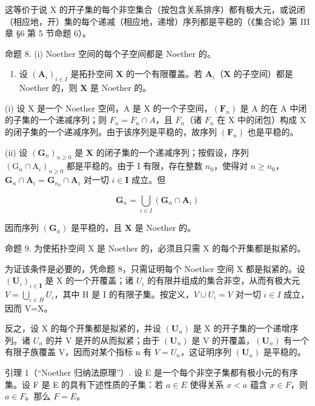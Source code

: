 这等价于说 X 的开子集的每个非空集合（按包含关系排序）都有极大元，或说闭（相应地，开）集的每个递减（相应地，递增）序列都是平稳的（《集合论》第 III 章 §6 第 5 节命题 6）。

命题 8. (i) Noether 空间的每个子空间都是 Noether 的。

\begin{enumerate}
\def\labelenumi{(\roman{enumi})}
\setcounter{enumi}{1}
\item
  设 \((\mathbf{A}_i)_{i\in I}\) 是拓扑空间 \(\mathbf{X}\) 的一个有限覆盖。若 \(\mathbf{A}_i\)（\(\mathbf{X}\) 的子空间）都是 Noether 的，则 \(\mathbf{X}\) 是 Noether 的。

\end{enumerate}

(i) 设 X 是一个 Noether 空间，A 是 X 的一个子空间，\((\mathbf{F}_{n})\) 是 A 的在 A 中闭的子集的一个递减序列；则 \(F_{n} = \overline{F}_{n} \cap A\)，且 \(\overline{F}_{n}\)（诸 \(F_{n}\) 在 X 中的闭包）构成 X 的闭子集的一个递减序列。由于该序列是平稳的，故序列 \((\mathbf{F}_{n})\) 也是平稳的。

(ii) 设 \((\mathbf{G}_n)_{n\geqslant 0}\) 是 \(\mathbf{X}\) 的闭子集的一个递减序列；按假设，序列 \((\mathrm{G}_n\cap \mathrm{A}_i)_{n\geqslant 0}\) 都是平稳的。由于 I 有限，存在整数 \(n_0\)，使得对 \(n\geqslant n_0\)，\(\mathbf{G}_n\cap \mathbf{A}_i = \mathbf{G}_{n_0}\cap \mathbf{A}_i\) 对一切 \(i\in \mathbf{I}\) 成立。但

\[
\mathbf {G} _ {n} = \bigcup_ {i \in I} \left(\mathbf {G} _ {n} \cap \mathbf {A} _ {i}\right)
\]

因而序列 \((\mathbf{G}_n)\) 是平稳的，且 \(\mathbf{X}\) 是 Noether 的。

命题 9. 为使拓扑空间 X 是 Noether 的，必须且只需 X 的每个开集都是拟紧的。

为证该条件是必要的，凭命题 8，只需证明每个 Noether 空间 X 都是拟紧的。设 \((\mathbf{U}_{\iota})_{\iota\in\mathbf{I}}\) 是 X 的一个开覆盖；诸 \(U_{\iota}\) 的有限并组成的集合非空，从而有极大元 \(V=\bigcup_{\iota\in H}U_{\iota}\)，其中 H 是 I 的有限子集。按定义，\(V\cup U_{\iota}=V\) 对一切 \(\iota\in I\) 成立，因而 V=X。

反之，设 X 的每个开集都是拟紧的，并设 \((\mathbf{U}_{n})\) 是 X 的开子集的一个递增序列。诸 \(U_{n}\) 的并 V 是开的从而拟紧；由于 \((\mathbf{U}_{n})\) 是 V 的开覆盖，\((\mathbf{U}_{n})\) 有一个有限子族覆盖 V，因而对某个指标 n 有 \(V = U_{n}\)，这证明序列 \((\mathbf{U}_{n})\) 是平稳的。

引理 1（``Noether 归纳法原理''）. 设 E 是一个每个非空子集都有极小元的有序集。设 F 是 E 的具有下述性质的子集：若 \(a \in E\) 使得关系 \(x < a\) 蕴含 \(x \in F\)，则 \(a \in F\)。那么 \(F = E\)。

